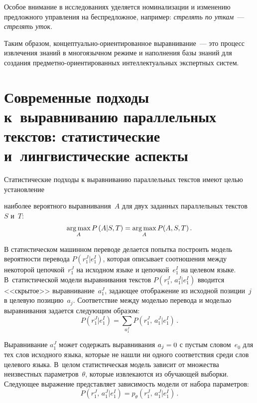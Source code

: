 \begin{multicols}{2}
   Особое внимание в исследованиях уделяется номинализации и изменению
предложного управления на беспредложное, например: \textit{стрелять по
уткам}~--- \textit{стрелять уток}.

   Таким образом, кон\-цеп\-ту\-аль\-но-ори\-ен\-ти\-ро\-ван\-ное выравнивание~--- это
процесс извлечения знаний в многоязычном режиме и наполнения базы знаний
для создания пред\-мет\-но-ори\-ен\-ти\-ро\-ван\-ных интеллектуальных экспертных систем.

\vspace*{-12pt}

    \section{Современные подходы к~выравниванию параллельных
текстов: статистические и~лингвистические аспекты}

     Статистические подходы к выравниванию параллельных текстов имеют
целью установление\linebreak\vspace*{-12pt}
\columnbreak

\noindent
 наиболее вероятного выравнивания~$A$ для двух заданных
параллельных текстов~$S$ и~$T$:
     \begin{equation*}
     \mathop{\mathrm{arg}\,\mathrm{max}}\limits_A  P\left( A\vert S,T\right) =\mathop{\mathrm{arg}\,\mathrm{max}}\limits_A P(A,S,T)\,.
     \end{equation*}

     В статистическом машинном переводе делается попытка построить модель
вероятности перевода $P\left( r_1^J\vert e_1^I\right)$, которая описывает
соотношения между некоторой цепочкой~$r_1^J$ на исходном языке и
цепочкой~$e_1^I$ на целевом языке. В~статистической модели выравнивания
текстов $P\left( r_1^J,\,a_1^J\vert e_1^I\right)$ вводится <<скрытое>>
выравнивание~$a_1^J$, задающее отображение из исходной позиции~$j$ в
целевую позицию~$a_j$. Соответствие между моделью перевода и моделью
выравнивания задается следующим образом:
     \begin{equation*}
     P\left( r_1^J\vert e_1^I\right)=\sum\limits_{a_1^J}P\left( r_1^J,\, a_1^J\vert
e_1^I\right)\,.
     \end{equation*}

     Выравнивание $a_1^J$ может содержать выравнивания $a_j\hm=0$ с пустым
словом~$e_0$ для тех слов исходного языка, которые не нашли ни одного
соответствия среди слов целевого языка. В~целом статистическая модель зависит
от множества неизвестных параметров~$\theta$, которые извлекаются из
обучающей выборки. Следующее выражение представляет зависимость модели от
набора параметров:
     \begin{equation*}
     P\left( r_1^J,\,a_1^J\vert e_1^I\right) = p_\theta \left( r_1^J,\,a_1^J\vert
e_1^I\right)\,.
     \end{equation*}


\end{multicols}
